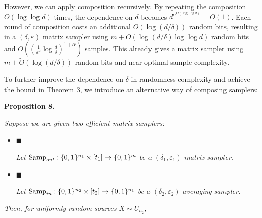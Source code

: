 \documentclass[10pt,a4paper]{article}
\begin{document}
However, we can apply composition recursively. By repeating the composition $O(\log\log d)$ times, the dependence on $d$ becomes $d^{\alpha^{O(\log\log d)}}=O(1)$. Each round of composition costs an additional $O(\log(d/\delta))$ random bits, resulting in a $(\delta,\varepsilon)$ matrix sampler using $m+O(\log(d/\delta)\log\log d)$ random bits and $O((\frac{1}{\varepsilon^{2}}\log\frac{d}{\delta})^{1+\alpha})$ samples. This already gives a matrix sampler using $m+\widetilde{O}(\log(d/\delta))$ random bits and near-optimal sample complexity.\par




To further improve the dependence on $\delta$ in randomness complexity and achieve the bound in Theorem 3, we introduce an alternative way of composing samplers:\par





\par\medskip\noindent\textbf{
\textbf{Proposition 8}\textbf{.}
}\par



\emph{Suppose we are given two efficient matrix samplers:}\par


\begin{itemize}


\item[] 
$\blacksquare$ 


\emph{Let }$\textup{{Samp}}_{out}:\{0,1\}^{n_{1}}\times[t_{1}]\to\{0,1\}^{m}$\emph{ be a }$(\delta_{1},\varepsilon_{1})$\emph{ matrix sampler.}\par





\item[] 
$\blacksquare$ 


\emph{Let }$\textup{{Samp}}_{in}:\{0,1\}^{n_{2}}\times[t_{2}]\to\{0,1\}^{n_{1}}$\emph{ be a }$(\delta_{2},\varepsilon_{2})$\emph{ }\emph{averaging}\emph{ sampler.}\par





\end{itemize}


\emph{Then, for uniformly random sources $X\sim U_{n_{2}}$,}\par
\end{document}
